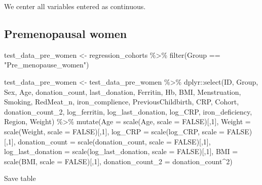 \documentclass[
]{article}
\newenvironment{Shaded}{\begin{snugshade}}{\end{snugshade}}
\newcommand{\AttributeTok}[1]{\textcolor[rgb]{0.77,0.63,0.00}{#1}}
\newcommand{\ConstantTok}[1]{\textcolor[rgb]{0.00,0.00,0.00}{#1}}
\newcommand{\DecValTok}[1]{\textcolor[rgb]{0.00,0.00,0.81}{#1}}
\newcommand{\FunctionTok}[1]{\textcolor[rgb]{0.00,0.00,0.00}{#1}}
\newcommand{\NormalTok}[1]{#1}
\newcommand{\OtherTok}[1]{\textcolor[rgb]{0.56,0.35,0.01}{#1}}
\newcommand{\SpecialCharTok}[1]{\textcolor[rgb]{0.00,0.00,0.00}{#1}}
\newcommand{\StringTok}[1]{\textcolor[rgb]{0.31,0.60,0.02}{#1}}
\begin{document}
We center all variables entered as continuous.

\hypertarget{premenopausal-women}{%
\subsection{Premenopausal women}\label{premenopausal-women}}

\begin{Shaded}
\begin{Highlighting}[]
\NormalTok{test\_data\_pre\_women }\OtherTok{\textless{}{-}}\NormalTok{ regression\_cohorts }\SpecialCharTok{\%\textgreater{}\%} 
  \FunctionTok{filter}\NormalTok{(Group }\SpecialCharTok{==} \StringTok{"Pre\_menopause\_women"}\NormalTok{)}

\NormalTok{test\_data\_pre\_women }\OtherTok{\textless{}{-}}\NormalTok{ test\_data\_pre\_women }\SpecialCharTok{\%\textgreater{}\%} 
\NormalTok{  dplyr}\SpecialCharTok{::}\FunctionTok{select}\NormalTok{(ID, Group, Sex, Age, donation\_count, last\_donation, Ferritin, Hb, BMI, Menstruation, Smoking, RedMeat\_n, iron\_complience, PreviousChildbirth, CRP, Cohort, donation\_count\_2, log\_ferritin, log\_last\_donation, log\_CRP, iron\_deficiency, Region, Weight) }\SpecialCharTok{\%\textgreater{}\%}
  \FunctionTok{mutate}\NormalTok{(}\AttributeTok{Age =} \FunctionTok{scale}\NormalTok{(Age, }\AttributeTok{scale =} \ConstantTok{FALSE}\NormalTok{)[,}\DecValTok{1}\NormalTok{],}
         \AttributeTok{Weight =} \FunctionTok{scale}\NormalTok{(Weight, }\AttributeTok{scale =} \ConstantTok{FALSE}\NormalTok{)[,}\DecValTok{1}\NormalTok{],}
         \AttributeTok{log\_CRP =} \FunctionTok{scale}\NormalTok{(log\_CRP, }\AttributeTok{scale =} \ConstantTok{FALSE}\NormalTok{)[,}\DecValTok{1}\NormalTok{],}
         \AttributeTok{donation\_count =} \FunctionTok{scale}\NormalTok{(donation\_count, }\AttributeTok{scale =} \ConstantTok{FALSE}\NormalTok{)[,}\DecValTok{1}\NormalTok{],}
         \AttributeTok{log\_last\_donation =} \FunctionTok{scale}\NormalTok{(log\_last\_donation, }\AttributeTok{scale =} \ConstantTok{FALSE}\NormalTok{)[,}\DecValTok{1}\NormalTok{],}
         \AttributeTok{BMI =} \FunctionTok{scale}\NormalTok{(BMI, }\AttributeTok{scale =} \ConstantTok{FALSE}\NormalTok{)[,}\DecValTok{1}\NormalTok{],}
         \AttributeTok{donation\_count\_2 =}\NormalTok{ donation\_count}\SpecialCharTok{\^{}}\DecValTok{2}\NormalTok{) }
\end{Highlighting}
\end{Shaded}

Save table
\end{document}
